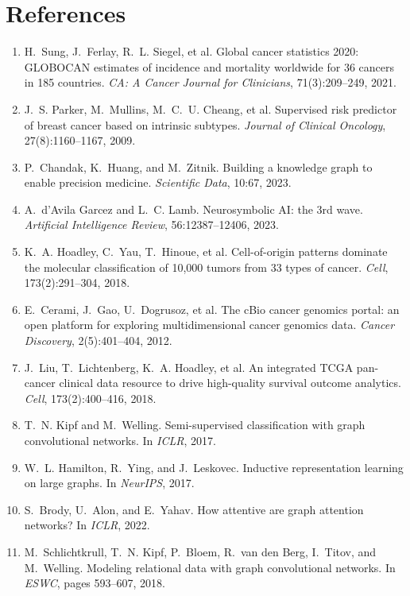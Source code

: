 \documentclass{mnnit}
\begin{document}
\chapter*{References}
\renewcommand{\labelenumi}{[\arabic{enumi}]}
\begin{enumerate}\setlength{\itemsep}{1pt}
\footnotesize
\item\label{ref:globocan} H.~Sung, J.~Ferlay, R.~L. Siegel, et al. Global cancer statistics 2020: GLOBOCAN estimates of incidence and mortality worldwide for 36 cancers in 185 countries. \emph{CA: A Cancer Journal for Clinicians}, 71(3):209--249, 2021.
\item\label{ref:pam50} J.~S. Parker, M.~Mullins, M.~C.~U. Cheang, et al. Supervised risk predictor of breast cancer based on intrinsic subtypes. \emph{Journal of Clinical Oncology}, 27(8):1160--1167, 2009.
\item\label{ref:primekg} P.~Chandak, K.~Huang, and M.~Zitnik. Building a knowledge graph to enable precision medicine. \emph{Scientific Data}, 10:67, 2023.
\item\label{ref:neurosymbolic} A.~d'Avila Garcez and L.~C. Lamb. Neurosymbolic AI: the 3rd wave. \emph{Artificial Intelligence Review}, 56:12387--12406, 2023.
\item\label{ref:hoadley} K.~A. Hoadley, C.~Yau, T.~Hinoue, et al. Cell-of-origin patterns dominate the molecular classification of 10,000 tumors from 33 types of cancer. \emph{Cell}, 173(2):291--304, 2018.
\item\label{ref:cbioportal} E.~Cerami, J.~Gao, U.~Dogrusoz, et al. The cBio cancer genomics portal: an open platform for exploring multidimensional cancer genomics data. \emph{Cancer Discovery}, 2(5):401--404, 2012.
\item\label{ref:tcgacdr} J.~Liu, T.~Lichtenberg, K.~A. Hoadley, et al. An integrated TCGA pan-cancer clinical data resource to drive high-quality survival outcome analytics. \emph{Cell}, 173(2):400--416, 2018.
\item\label{ref:gcn} T.~N. Kipf and M.~Welling. Semi-supervised classification with graph convolutional networks. In \emph{ICLR}, 2017.
\item\label{ref:graphsage} W.~L. Hamilton, R.~Ying, and J.~Leskovec. Inductive representation learning on large graphs. In \emph{NeurIPS}, 2017.
\item\label{ref:gatv2} S.~Brody, U.~Alon, and E.~Yahav. How attentive are graph attention networks? In \emph{ICLR}, 2022.
\item\label{ref:rgcn} M.~Schlichtkrull, T.~N. Kipf, P.~Bloem, R.~van den Berg, I.~Titov, and M.~Welling. Modeling relational data with graph convolutional networks. In \emph{ESWC}, pages 593--607, 2018.

\end{enumerate}
\end{document}
